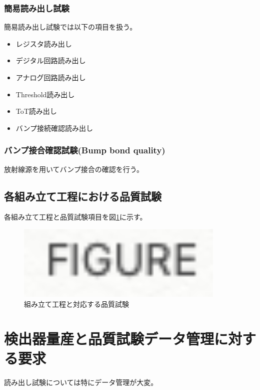 \subsubsection{簡易読み出し試験}
簡易読み出し試験では以下の項目を扱う。
\begin{itemize}
  \item レジスタ読み出し
  \item デジタル回路読み出し
  \item アナログ回路読み出し
  \item Threshold読み出し
  \item ToT読み出し
  \item バンプ接続確認読み出し
\end{itemize}

\subsubsection{バンプ接合確認試験(Bump bond quality)}
放射線源を用いてバンプ接合の確認を行う。

\subsection{各組み立て工程における品質試験}

各組み立て工程と品質試験項目を図\ref{stage_test_flow}に示す。
\begin{figure}[bpt]\centering
\includegraphics[width=10cm]{figure}
\caption[組み立て工程と対応する品質試験]{組み立て工程と対応する品質試験}
\label{stage_test_flow}
\end{figure}

\section{検出器量産と品質試験データ管理に対する要求}

読み出し試験については特にデータ管理が大変。

